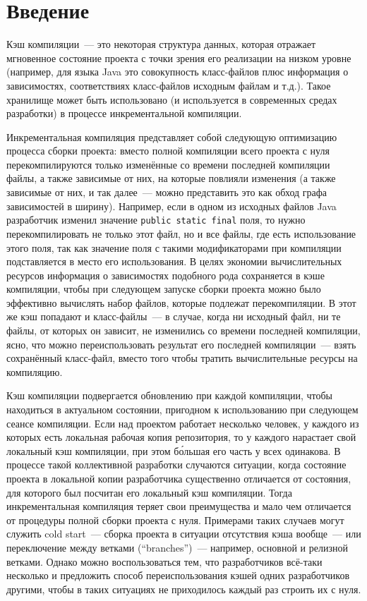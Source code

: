 



\chapter*{Введение}
Кэш компиляции~--- это некоторая структура данных, которая отражает мгновенное состояние проекта с точки зрения его реализации на низком уровне (например, для языка Java это совокупность класс-файлов плюс информация о зависимостях, соответствиях класс-файлов исходным файлам и т.д.). Такое хранилище может быть использовано (и используется в современных средах разработки) в процессе инкрементальной компиляции.

Инкрементальная компиляция представляет собой следующую оптимизацию процесса сборки проекта: вместо полной компиляции всего проекта с нуля перекомпилируются только изменённые со времени последней компиляции файлы, а также зависимые от них, на которые повлияли изменения (а также зависимые от них, и так далее~--- можно представить это как обход графа зависимостей в ширину). Например, если в одном из исходных файлов Java разработчик изменил значение \texttt{public static final} поля, то нужно перекомпилировать не только этот файл, но и все файлы, где есть использование этого поля, так как значение поля с такими модификаторами при компиляции подставляется в место его использования. В целях экономии вычислительных ресурсов информация о зависимостях подобного рода сохраняется в кэше компиляции, чтобы при следующем запуске сборки проекта можно было эффективно вычислять набор файлов, которые подлежат перекомпиляции. В этот же кэш попадают и класс-файлы~--- в случае, когда ни исходный файл, ни те файлы, от которых он зависит, не изменились со времени последней компиляции, ясно, что можно переиспользовать результат его последней компиляции~--- взять сохранённый класс-файл, вместо того чтобы тратить вычислительные ресурсы на компиляцию.

Кэш компиляции подвергается обновлению при каждой компиляции, чтобы находиться в актуальном состоянии, пригодном к использованию при следующем сеансе компиляции. Если над проектом работает несколько человек, у каждого из которых есть локальная рабочая копия репозитория, то у каждого нарастает свой локальный кэш компиляции, при этом б\'{о}льшая его часть у всех одинакова. В процессе такой коллективной разработки случаются ситуации, когда состояние проекта в локальной копии разработчика существенно отличается от состояния, для которого был посчитан его локальный кэш компиляции. Тогда инкрементальная компиляция теряет свои преимущества и мало чем отличается от процедуры полной сборки проекта с нуля. Примерами таких случаев могут служить cold start~--- сборка проекта в ситуации отсутствия кэша вообще~--- или переключение между ветками (``branches'')~--- например, основной и релизной ветками. Однако можно воспользоваться тем, что разработчиков всё-таки несколько и предложить способ переиспользования кэшей одних разработчиков другими, чтобы в таких ситуациях не приходилось каждый раз строить их с нуля.


